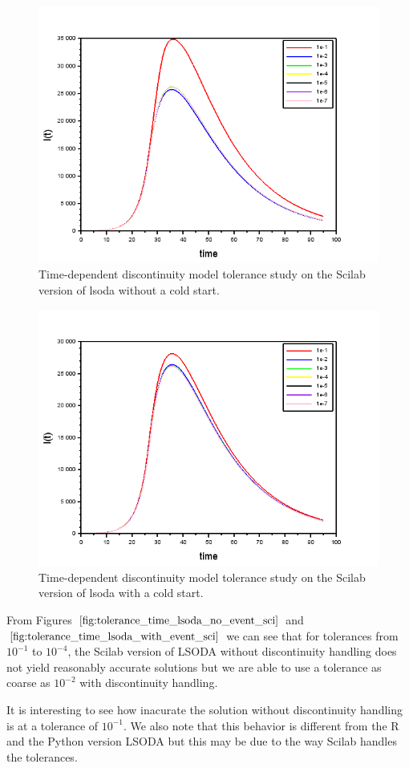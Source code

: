 \begin{figure}[H]
\centering
\includegraphics[width=0.7\linewidth]{./figures/tolerance_time_lsoda_no_event_sci}
\caption{Time-dependent  discontinuity model tolerance study on the Scilab version of lsoda without a cold start.}
\label{fig:tolerance_time_lsoda_no_event_sci}
\end{figure}

\begin{figure}[H]
\centering
\includegraphics[width=0.7\linewidth]{./figures/tolerance_time_lsoda_with_event_sci}
\caption{Time-dependent  discontinuity model tolerance study on the Scilab version of lsoda with a cold start.}
\label{fig:tolerance_time_lsoda_with_event_sci}
\end{figure}

From Figures $\ref{fig:tolerance_time_lsoda_no_event_sci}$ and $\ref{fig:tolerance_time_lsoda_with_event_sci}$ we can see that for tolerances from $10^{-1}$ to $10^{-4}$, the Scilab version of LSODA without discontinuity handling does not yield reasonably accurate solutions but we are able to use a tolerance as coarse as $10^{-2}$ with discontinuity handling. 

It is interesting to see how inacurate the solution without discontinuity handling is at a tolerance of $10^{-1}$. We also note that this behavior is different from the R and the Python version LSODA but this may be due to the way Scilab handles the tolerances.

